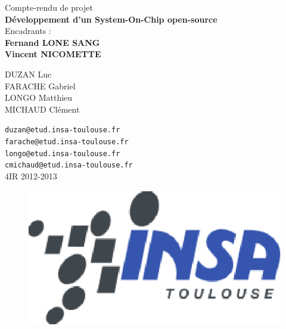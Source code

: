 \documentclass[a4paper]{report}
\begin{document}
\begin{titlepage}
  \centering
  \vspace{7\baselineskip}
  {\huge Compte-rendu de projet }\\
  \vspace{1cm}
  {\Huge{\bf Développement d'un System-On-Chip open-source }}\\
  \vspace{1cm}
  Encadrants :\\
  {\bf Fernand LONE SANG}\\
  {\bf Vincent NICOMETTE}\\
  
  \par
  \normalfont
  \vspace{1cm}
  DUZAN Luc\\
  \vspace{0.3cm}
  FARACHE Gabriel\\
  \vspace{0.3cm}
  LONGO Matthieu\\
  \vspace{0.3cm}
  MICHAUD Clément\\
  \vspace{1cm}
  \par
  {\tt duzan@etud.insa-toulouse.fr}\\
  {\tt farache@etud.insa-toulouse.fr}\\
  {\tt longo@etud.insa-toulouse.fr}\\
  {\tt cmichaud@etud.insa-toulouse.fr}\\
  \vspace{1cm}
  4IR 2012-2013
  \begin{figure}[h]
    \centering
    \includegraphics[scale=0.4]{INSA-logo.eps}
  \end{figure}
  

\end{titlepage}
\end{document}

